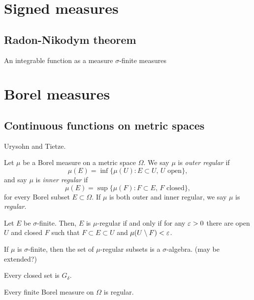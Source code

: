 \documentclass{../../large}
\begin{document}
\chapter{Signed measures}




\section{Radon-Nikodym theorem}

An integrable function as a measure
$\sigma$-finite measures



\chapter{Borel measures}



\section{Continuous functions on metric spaces}

Urysohn and Tietze.


\begin{prb}
Let $\mu$ be a Borel measure on a metric space $\Omega$.
We say $\mu$ is \emph{outer regular} if
\[\mu(E)=\inf\{\mu(U):E\subset U,\,U\text{ open}\},\]
and say $\mu$ is \emph{inner regular} if
\[\mu(E)=\sup\{\mu(F):F\subset E,\,F\text{ closed}\},\]
for every Borel subset $E\subset\Omega$.
If $\mu$ is both outer and inner regular, we say $\mu$ is \emph{regular}.
\begin{parts}
\item Let $E$ be $\sigma$-finite. Then, $E$ is $\mu$-regular if and only if for any $\varepsilon>0$ there are open $U$ and closed $F$ such that $F\subset E\subset U$ and $\mu(U\setminus F)<\varepsilon$.
\item If $\mu$ is $\sigma$-finite, then the set of $\mu$-regular subsets is a $\sigma$-algebra. (may be extended?)
\item Every closed set is $G_\delta$.
\item Every finite Borel measure on $\Omega$ is regular.
\end{parts}
\end{prb}
\begin{pf}
\end{pf}
\end{document}

